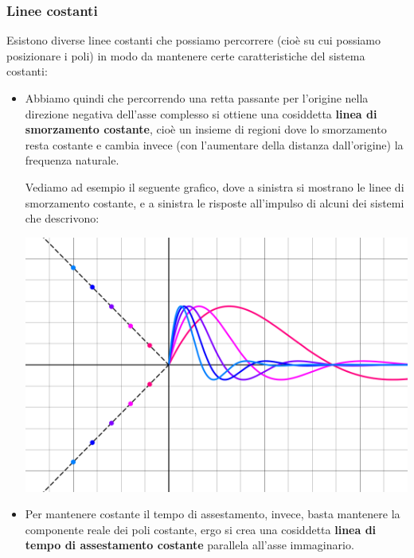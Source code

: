 \documentclass[a4paper,11pt]{article}
\begin{document}
\subsubsection{Linee costanti}
Esistono diverse linee costanti che possiamo percorrere (cioè su cui possiamo posizionare i poli) in modo da mantenere certe caratteristiche del sistema costanti:
\begin{itemize}
	\item 
		Abbiamo quindi che percorrendo una retta passante per l'origine nella direzione negativa dell'asse complesso si ottiene una cosiddetta \textbf{linea di smorzamento costante}, cioè un insieme di regioni dove lo smorzamento resta costante e cambia invece (con l'aumentare della distanza dall'origine) la frequenza naturale. 

		Vediamo ad esempio il seguente grafico, dove a sinistra si mostrano le linee di smorzamento costante, e a sinistra le risposte all'impulso di alcuni dei sistemi che descrivono:
		\begin{center}
			\includegraphics[scale=0.28]{../figures/fixed_damping.png}
		\end{center}
	\item
		Per mantenere costante il tempo di assestamento, invece, basta mantenere la componente reale dei poli costante, ergo si crea una cosiddetta \textbf{linea di tempo di assestamento costante} parallela all'asse immaginario. 

		\newpage


\end{itemize}
\end{document}
